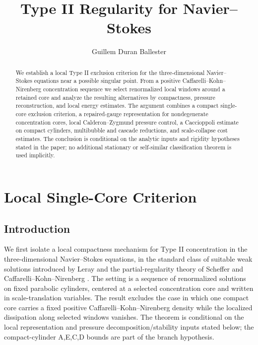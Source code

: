\documentclass[11pt]{amsart}
\title[Type II Regularity]{Type II Regularity for Navier--Stokes}
\author{Guillem Duran Ballester}
\date{}
\def\({}%
\def\){}%
\theoremstyle{plain}
\theoremstyle{definition}
\theoremstyle{remark}
\begin{document}
\begin{abstract}
We establish a local Type II exclusion criterion for the three-dimensional
Navier--Stokes equations near a possible singular point.  From a positive
Caffarelli--Kohn--Nirenberg concentration sequence we select renormalized local
windows around a retained core and analyze the resulting alternatives by
compactness, pressure reconstruction, and local energy estimates.  The argument
combines a compact single-core exclusion criterion, a repaired-gauge
representation for nondegenerate concentration cores, local Calderon--Zygmund
pressure control, a Caccioppoli estimate on compact cylinders, multibubble and
cascade reductions, and scale-collapse cost estimates.  The conclusion is
conditional on the analytic inputs and rigidity hypotheses stated in the paper;
no additional stationary or self-similar classification theorem is used
implicitly.
\end{abstract}

\maketitle

\setcounter{tocdepth}{2}
\tableofcontents


\clearpage
\section{Local Single-Core Criterion}\label{sec:single-core-criterion}
\subsection{Introduction}

We first isolate a local compactness mechanism for Type II concentration in
the three-dimensional Navier--Stokes equations, in the standard class of
suitable weak solutions introduced by Leray and the partial-regularity theory of Scheffer and
Caffarelli--Kohn--Nirenberg
\cite{Leray1934,Scheffer1976,CaffarelliKohnNirenberg1982,Lin1998}.  The
setting is a sequence of
renormalized solutions on fixed parabolic cylinders, centered at a selected
concentration core and written in scale-translation variables.  The result
excludes the case in which one compact core carries a fixed positive
Caffarelli--Kohn--Nirenberg density while the localized dissipation along
selected windows vanishes.  The theorem is conditional on the local
representation and pressure decomposition/stability inputs stated below; the
compact-cylinder \(A,E,C,D\) bounds are part of the branch hypothesis.
\end{document}
